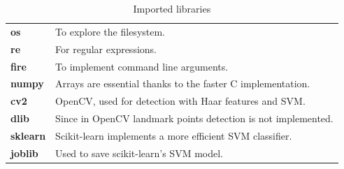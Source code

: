 \begin{table}[h!t]
    \centering
    \caption{Imported libraries}
    \label{tab:libraries}
    \begin{tabular}{ll}
        \textbf{os} & To explore the filesystem. \\
        \textbf{re} & For regular expressions. \\
        \textbf{fire} & To implement command line arguments. \\
        \textbf{numpy} & Arrays are essential thanks to the faster C implementation. \\
        \textbf{cv2} & OpenCV, used for detection with Haar features and SVM. \\
        \textbf{dlib} & Since in OpenCV landmark points detection is not implemented. \\
        \textbf{sklearn} & Scikit-learn implements a more efficient SVM classifier. \\
        \textbf{joblib} & Used to save scikit-learn's SVM model. \\
    \end{tabular}
\end{table}
